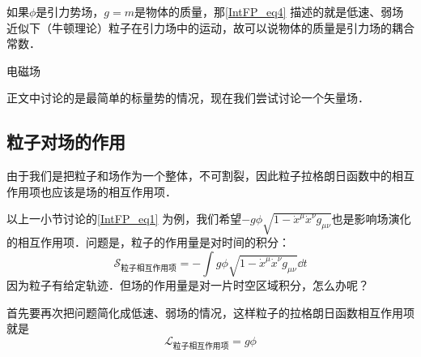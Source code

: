 如果$\phi$是引力势场，$g=m$是物体的质量，那\autoref{IntFP_eq4} 描述的就是低速、弱场近似下（牛顿理论）粒子在引力场中的运动，故可以说物体的质量是引力场的耦合常数．

\begin{example}{电磁场}

正文中讨论的是最简单的标量势的情况，现在我们尝试讨论一个矢量场．



\end{example}






\subsection{粒子对场的作用}

由于我们是把粒子和场作为一个整体，不可割裂，因此粒子拉格朗日函数中的相互作用项也应该是场的相互作用项．

以上一小节讨论的\autoref{IntFP_eq1} 为例，我们希望$-g\phi\sqrt{1-\dot{x}^\mu \dot{x}^\nu g_{\mu\nu}}$也是影响场演化的相互作用项．问题是，粒子的作用量是对时间的积分：
\begin{equation}
\mathcal{S}_{\text{粒子相互作用项}} = -\int g\phi\sqrt{1-\dot{x}^\mu \dot{x}^\nu g_{\mu\nu}}\dd t
\end{equation}
因为粒子有给定轨迹．但场的作用量是对一片时空区域积分，怎么办呢？

首先要再次把问题简化成低速、弱场的情况，这样粒子的拉格朗日函数相互作用项就是
\begin{equation}
\mathcal{L}_{\text{粒子相互作用项}} = g\phi
\end{equation}

















